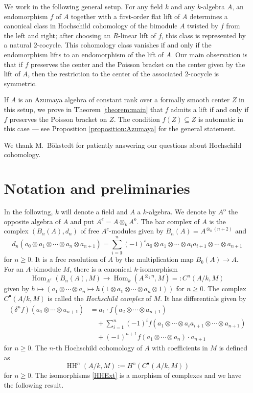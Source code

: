 \documentclass[a4paper,11pt,reqno]{amsart}%
\theoremstyle{definition}
\newcommand{\HH}{\operatorname{HH}}
\newcommand{\Hom}{\operatorname{Hom}}
\newcommand{\op}{{\operatorname{o}}}
\newcommand{\<}{\<}
\renewcommand{\>}{\>}
\numberwithin{equation}{subsection}
\begin{document}
We work in the following general setup. 
For any field $k$ and any $k$-algebra $A$, an endomorphism $f$ of $A$ together with a first-order flat lift of $A$ determines a canonical class in Hochschild cohomology of the bimodule $A$
twisted by $f$ from the left and right; after choosing an $R$-linear lift of $f$, this class is represented by a natural $2$-cocycle.
This cohomology class vanishes if and only if 
the endomorphism lifts to an endomorphism of the lift of $A$. 
Our main observation is that if $f$ preserves the center and the 
Poisson bracket on the center given by the lift of $A$, then the restriction to the center of the associated $2$-cocycle is symmetric. 

If $A$ is an Azumaya algebra of constant rank over a formally smooth center $Z$ in this setup, we prove in Theorem \ref{theorem:main} that $f$ admits 
a lift if and only if $f$ preserves the Poisson bracket on $Z$. The condition $f(Z)\subseteq Z$ is automatic
in this case --- see Proposition \ref{proposition:Azumaya} for the general statement.

We thank M.~B\"okstedt for patiently answering our questions about Hochschild cohomology.



\section{Notation and preliminaries}

In the following, $k$ will denote a field and $A$ a $k$-algebra. 
We denote by $A^\op$ the opposite algebra of $A$
and put $A^e = A\otimes_k A^\op$. The bar complex of $A$ is the complex $(B_n(A), d_n)$ of 
free $A^e$-modules given by
$B_n(A) = A^{\otimes_k (n+2)}$ and
$$
d_n(a_0 \otimes a_1 \otimes \cdots \otimes a_n\otimes a_{n+1}) =
\sum_{i=0}^n (-1)^i a_0\otimes a_1 \otimes \cdots \otimes a_i a_{i+1} \otimes \cdots \otimes a_{n+1}
$$
for $n\geq 0$. It is a free resolution of $A$ by the multiplication map $B_0(A) \rightarrow A$. For an
$A$-bimodule $M$, there is a canonical $k$-isomorphism 
\begin{equation}\label{HHExt}
\Hom_{A^e}(B_n(A), M) \rightarrow  \Hom_k(A^{\otimes_k n}, M) =: C^n(A/k, M)
\end{equation}
given by $h\mapsto (a_1\otimes \cdots \otimes a_n \mapsto h(1\otimes a_1 \otimes \cdots \otimes a_n\otimes 1))$ for $n\geq 0$.
The complex $C^\bullet(A/k, M)$ is called 
the \emph{Hochschild complex} of $M$. It has differentials given by
\begin{align*}
(\delta^n f)(a_1 \otimes \cdots \otimes a_{n+1}) &= a_1 \cdot f(a_2 \otimes \cdots \otimes a_{n+1}) \\
&\quad + \sum_{i=1}^{n} (-1)^i f(a_1 \otimes \cdots \otimes a_i a_{i+1} \otimes \cdots \otimes a_{n+1}) \\
&\quad + (-1)^{n+1} f(a_1 \otimes \cdots \otimes a_n) \cdot a_{n+1}
\end{align*}
for $n\geq 0$.
The $n$-th Hochschild cohomology of $A$ with coefficients in $M$ is defined as
$$
\HH^n(A/k,M) := H^n(C^\bullet(A/k,M))
$$
for $n \geq 0$. The isomorphisms \eqref{HHExt} is a morphism of complexes and we have the following result.
\end{document}
